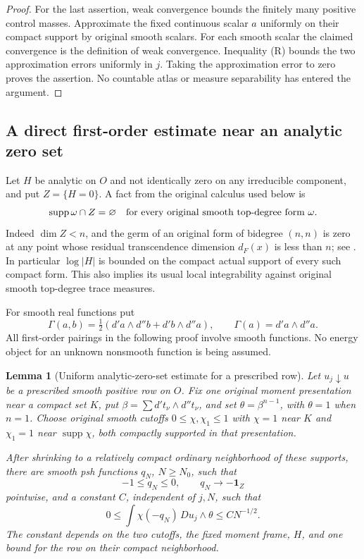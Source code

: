 \documentclass[11pt,a4paper]{article}
\numberwithin{equation}{section}
\newtheorem{lemma}[theorem]{Lemma}
\theoremstyle{definition}
\theoremstyle{remark}
\begin{document}
\begin{proof}
For the last assertion, weak convergence bounds the finitely many
positive control masses.  Approximate the fixed continuous scalar
$a$ uniformly on their compact support by original smooth scalars.
For each smooth scalar the claimed convergence is the definition
of weak convergence.  Inequality (R) bounds the two approximation
errors uniformly in $j$.  Taking the approximation error to zero
proves the assertion.  No countable atlas or measure separability
has entered the argument.
\end{proof}

\subsection{A direct first-order estimate near an analytic zero set}

Let $H$ be analytic on $O$ and not identically zero on any
irreducible component, and put $Z=\{H=0\}$.  A fact from the
original calculus used below is
\begin{equation}
 \operatorname{supp}\omega\cap Z=\varnothing
 \quad\hbox{for every original smooth top-degree form }\omega.
 \label{eq:r5-top-form-avoids-divisor}
\end{equation}
Indeed $\dim Z<n$, and the germ of an original form of bidegree
$(n,n)$ is zero at any point whose residual transcendence dimension
$d_F(x)$ is less than $n$; see
\cite[Proposition 15.2.1]{CLD25}.  In particular $\log|H|$ is
bounded on the compact actual support of every such compact form.
This also implies its usual local integrability against original
smooth top-degree trace measures.

For smooth real functions put
\[
 \Gamma(a,b)=\tfrac12(d'a\wedge d''b+d'b\wedge d''a),
 \qquad \Gamma(a)=d'a\wedge d''a.
\]
All first-order pairings in the following proof involve smooth
functions.  No energy object for an unknown nonsmooth function
is being assumed.

\begin{lemma}[Uniform analytic-zero-set estimate for a prescribed row]
\label{lem:r5-prescribed-row-divisor-estimate}
Let $u_j\downarrow u$ be a prescribed smooth positive row on $O$.
Fix one original moment presentation near a compact set $K$,
put $\beta=\sum d't_\nu\wedge d''t_\nu$, and set
$\theta=\beta^{n-1}$, with $\theta=1$ when $n=1$.
Choose original smooth cutoffs $0\leq\chi,\chi_1\leq1$ with
$\chi=1$ near $K$ and $\chi_1=1$ near $\operatorname{supp}\chi$,
both compactly supported in that presentation.

After shrinking to a relatively compact ordinary neighborhood of
these supports, there are smooth psh functions $q_N$, $N\geq N_0$,
such that
\[
 -1\leq q_N\leq0,\qquad
 q_N\longrightarrow-\mathbf1_Z
\]
pointwise, and a constant $C$, independent of $j,N$, such that
\begin{equation}
 0\leq\int\chi(-q_N)\,Du_j\wedge\theta
                       \leq C N^{-1/2}.
 \label{eq:r5-uniform-divisor-estimate}
\end{equation}
The constant depends on the two cutoffs, the fixed moment frame,
$H$, and one bound for the row on their compact neighborhood.
\end{lemma}
\end{document}
